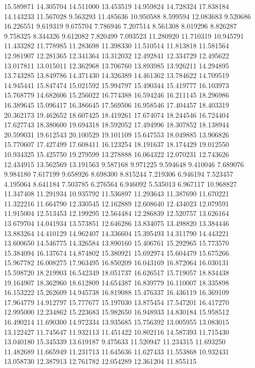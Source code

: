 15.589871
14.305704
14.511000
13.453519
14.959824
14.728324
17.838184
14.143233
11.567028
9.563293
11.485636
10.950588
8.599594
12.083683
9.520686
16.226551
9.619319
9.675704
7.786946
7.207514
8.561308
8.019296
8.826287
9.758325
8.344326
9.612082
7.820499
7.093523
11.280920
11.710319
10.945791
11.433282
11.778985
11.283698
11.398330
11.510514
11.813818
11.581564
12.981907
12.281365
12.341364
13.312032
12.492841
12.334729
12.495622
13.017811
13.015011
12.362968
13.706760
13.893985
13.926211
14.294895
13.743285
13.849786
14.371430
14.326389
14.461362
13.784622
14.709519
14.945441
15.847474
15.021592
15.994797
15.490344
15.419777
16.103973
15.768779
14.682606
15.256022
16.774388
16.594246
16.211145
18.296986
16.389645
15.096417
16.386645
17.569506
16.958546
17.404457
18.403319
20.362173
19.462652
18.607425
18.419261
17.674074
18.244546
16.724404
17.627743
18.380600
19.694318
18.592052
17.494996
18.307852
18.138944
20.599031
19.612543
20.100529
19.101109
15.647553
18.049885
13.906826
15.770607
17.427499
17.608411
16.123254
18.191637
18.174429
19.012550
10.934325
15.425750
19.279599
13.278888
16.064322
12.070231
12.743626
12.434915
13.562569
13.191563
9.587168
9.971225
9.594648
9.410046
7.689076
9.984180
7.617199
9.658926
8.698300
8.815244
7.219306
6.946194
7.523457
4.195064
8.641184
7.503785
6.276564
6.946092
5.535013
6.967117
10.968827
11.347408
11.291934
10.935792
11.536897
11.293643
11.387690
11.670221
11.322216
11.664790
12.330545
12.162889
12.608640
12.434023
12.079591
11.915004
12.513453
12.199295
12.564484
12.286839
12.520757
13.626164
13.679704
14.041934
13.573851
12.646286
13.834075
13.498820
13.384446
13.883264
14.410129
14.962407
14.336604
15.395493
14.311790
14.443221
13.600650
14.546775
14.326584
13.890160
15.406761
15.292965
15.773570
15.384094
16.137674
14.874802
15.380921
15.692974
15.604479
15.675266
15.967782
16.008275
17.963495
16.850209
16.043169
16.872064
16.030131
15.598720
18.219903
16.542349
18.051737
16.626517
15.719057
18.834438
19.164907
18.362960
18.612809
14.654387
16.839779
16.110007
18.335898
16.153222
15.262609
14.945738
16.819088
15.476337
16.436119
16.369109
17.964779
14.912797
15.777677
15.197030
13.875454
17.547201
16.417270
12.995000
12.234862
15.223683
15.982650
16.948933
14.830184
15.958512
16.490214
11.690300
14.972334
13.935685
15.756392
13.005955
13.083015
13.122427
11.745647
11.932113
11.451422
10.802116
14.587393
11.715430
13.040180
15.345339
13.619187
9.475633
11.520947
11.234315
11.693250
11.482689
11.665949
11.231713
11.645636
11.627433
11.553868
10.932431
13.058730
12.387913
12.761782
12.054289
12.361204
11.855115
